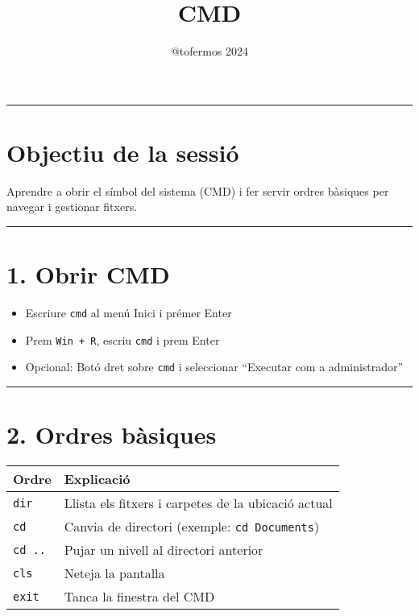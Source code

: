 \documentclass[
  a4paper,
]{article}
\title{CMD}
\author{@tofermos 2024}
\date{}
\providecommand{\tightlist}{%
  \setlength{\itemsep}{0pt}\setlength{\parskip}{0pt}}
\begin{document}
\maketitle

{
\setcounter{tocdepth}{2}
\tableofcontents
}
\newpage

\renewcommand\tablename{Tabla}

\begin{center}\rule{0.5\linewidth}{0.5pt}\end{center}

\section{Objectiu de la sessió}\label{objectiu-de-la-sessiuxf3}

Aprendre a obrir el símbol del sistema (CMD) i fer servir ordres
bàsiques per navegar i gestionar fitxers.

\begin{center}\rule{0.5\linewidth}{0.5pt}\end{center}

\section{1. Obrir CMD}\label{obrir-cmd}

\begin{itemize}
\tightlist
\item
  Escriure \texttt{cmd} al menú Inici i prémer Enter
\item
  Prem \texttt{Win\ +\ R}, escriu \texttt{cmd} i prem Enter
\item
  Opcional: Botó dret sobre \texttt{cmd} i seleccionar ``Executar com a
  administrador''
\end{itemize}

\begin{center}\rule{0.5\linewidth}{0.5pt}\end{center}

\section{2. Ordres bàsiques}\label{ordres-buxe0siques}

\begin{longtable}[]{@{}ll@{}}
\toprule\noalign{}
Ordre & Explicació \\
\midrule\noalign{}
\endhead
\bottomrule\noalign{}
\endlastfoot
\texttt{dir} & Llista els fitxers i carpetes de la ubicació actual \\
\texttt{cd} & Canvia de directori (exemple: \texttt{cd\ Documents}) \\
\texttt{cd\ ..} & Pujar un nivell al directori anterior \\
\texttt{cls} & Neteja la pantalla \\
\texttt{exit} & Tanca la finestra del CMD \\
\end{longtable}
\end{document}

